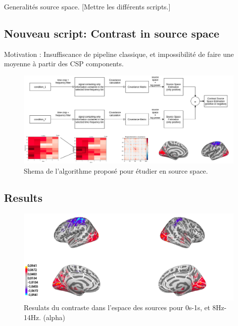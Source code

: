 Generalités source space.
[Mettre les différents scripts.]

\subsection{Nouveau script: Contrast in source space}
Motivation : Insuffiscance de pipeline classique, et impossibilité de faire une moyenne à partir des CSP components.

\begin{figure}[ht]
    \centering
    \includegraphics[width=15cm]{images_report/source/flow_source_contrasts.png}
    \caption[Shema de la procedure pour visualiser le contraste en source space.]%
    {Shema de l'algorithme proposé pour étudier en source space.}
    \label{flow_source_contrasts}
\end{figure}

\subsection{Results}


\begin{figure}[ht]
    \centering
    \includegraphics[width=15cm]{images_report/source/source_results_3d_cropped.png}
    \caption[Resulats du contraste dans l'espace des sources (alpha)]%
    {Resulats du contraste dans l'espace des sources pour 0s-1s, et 8Hz-14Hz. (alpha)}
    \label{results_source_space_alpha}
\end{figure}

